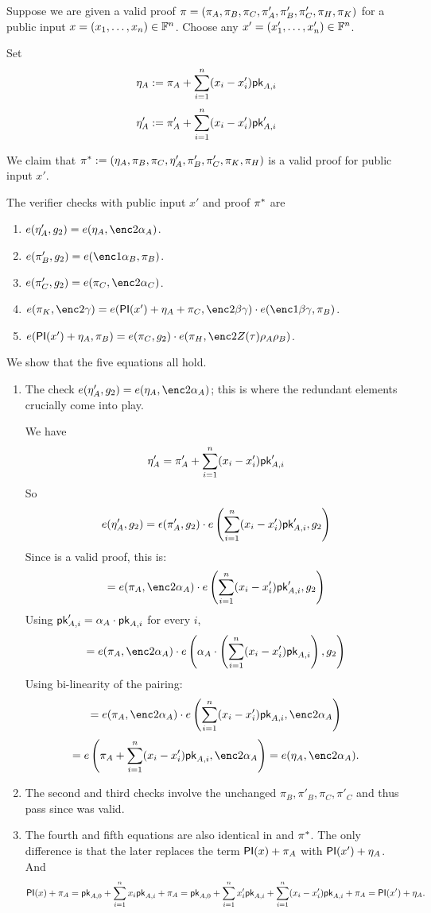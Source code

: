 \documentclass[11pt]{article}
\numberwithin{figure}{section} %
\newcommand{\eps}{\epsilon}
\newcommand{\e}{\eps}
\begin{document}
 
 Suppose we are given a valid proof $\pi = (\pi_A,\pi_B,\pi_C,\pi'_A,\pi'_B,\pi'_C,\pi_H,\pi_K)$
 for a public input $x=(x_1,\ldots,x_n)\in \mathbb F^{n}$.
 Choose any $x'=(x'_1,\ldots,x'_n)\in \mathbb F^n$.

 Set 
 \[\eta_A:= \pi_A + \sum_{i=1}^n (x_i-x'_i)\mathsf{pk}_{A,i}\]
 \[\eta'_A:= \pi'_A + \sum_{i=1}^n (x_i-x'_i) \mathsf{pk}'_{A,i}\]
 
 We claim that $\pi^* := (\eta_A,\pi_B,\pi_C,\eta'_A,\pi'_B,\pi'_C,\pi_K,\pi_H)$ is a valid proof for
 public input $x'$.
 
 The verifier checks with public input $x'$ and proof $\pi^*$ are
\begin{enumerate}
 \item $e(\eta'_A,g_2)=e(\eta_A,\enc2{\alpha_A})$.
\item $e(\pi'_B, g_2)=e(\enc1{\alpha_B},\pi_B)$.
\item $e(\pi'_C,g_2)=e(\pi_C,\enc2{\alpha_C})$.
\item $e(\pi_K,\enc2{\gamma})=e(\PI(x')+\eta_A+\pi_C,\enc2{\beta\gamma})\cdot e(\enc1{\beta\gamma},\pi_B)$.
\item $e(\PI(x')+\eta_A,\pi_B)= e(\pi_C,g_2)\cdot e(\pi_H,\enc2{Z(\tau)\rho_A\rho_B})$.
 \end{enumerate}
 
 
 We show that the five equations all hold.
 \begin{enumerate}
  \item The check  $e(\eta'_A,g_2)=e(\eta_A,\enc2{\alpha_A})$;
  this is where the redundant elements crucially come into play.
  
  
  We have
  \[\eta'_A = \pi'_A + \sum_{i=1}^n (x_i-x'_i) \mathsf{pk}'_{A,i}\]
 So
 \[e(\eta'_A,g_2) = \e(\pi'_A,g_2)\cdot e\left(\sum_{i=1}^n (x_i-x'_i) \pk'_{A,i},g_2\right)\]
 Since \prf is a valid proof, this is:
  \[=e(\pi_A,\enc2{\alpha_A})\cdot e\left(\sum_{i=1}^n (x_i-x'_i) \pk'_{A,i},g_2\right)\]
  Using $\mathsf{pk}'_{A,i} = \alpha_A\cdot \mathsf{pk}_{A,i}$ for every $i$,
  \[=e(\pi_A,\enc2{\alpha_A})\cdot e\left(\alpha_A\cdot \left(\sum_{i=1}^n (x_i-x'_i) \pk_{A,i}\right),g_2\right)\]
Using bi-linearity of the pairing:
 \[=e(\pi_A,\enc2{\alpha_A})\cdot e\left(\sum_{i=1}^n (x_i-x'_i) \pk_{A,i},\enc2{\alpha_A}\right)\]
  \[=e\left(\pi_A+\sum_{i=1}^n (x_i-x'_i) \pk_{A,i},\enc2{\alpha_A}\right) = e(\eta_A,\enc2{\alpha_A}).\]
  \item The second and third checks involve the unchanged $\pi_B,\pi'_B,\pi_C,\pi'_C$
  and thus pass since \prf was valid.
  \item The fourth and fifth equations are also identical in \prf and $\pi^*$.
  The only difference is that the later replaces the term $\mathsf{PI}(x) + \pi_A$ 
  with $\mathsf{PI}(x')+ \eta_A$. And 
    \[\mathsf{PI}(x) + \pi_A = \mathsf{pk}_{A,0} + \sum_{i=1}^n x_i\mathsf{pk}_{A,i} + \pi_A = 
  \mathsf{pk}_{A,0} + \sum_{i=1}^n x'_i\mathsf{pk}_{A,i} +  \sum_{i=1}^n (x_i-x'_i) \mathsf{pk}_{A,i}  + \pi_A =
  \mathsf{PI}(x') + \eta_A.
  \]

 \end{enumerate}
 
\end{document}

